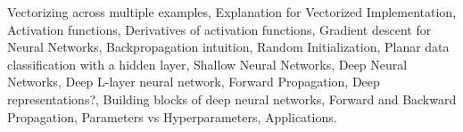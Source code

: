 \documentclass[11pt,a4paper]{moderncv}
\begin{document}
{            Vectorizing across multiple examples,                                                                 %
            Explanation for Vectorized Implementation,                                                            %
            Activation functions,                                                                                 %
            Derivatives of activation functions,                                                                  %
            Gradient descent for Neural Networks,                                                                 %
            Backpropagation intuition,                                                                            %
            Random Initialization,                                                                                %
            Planar data classification with a hidden layer,                                                       %
            Shallow Neural Networks,                                                                              %
            Deep Neural Networks,                                                                                 %
            Deep L-layer neural network,                                                                          %
            Forward Propagation,                                                                                  %
            Deep representations?,                                                                                %
            Building blocks of deep neural networks,                                                              %
            Forward and Backward Propagation,                                                                     %
            Parameters vs Hyperparameters,                                                                        %
            Applications.                                                                                         %
    }
\end{document}
